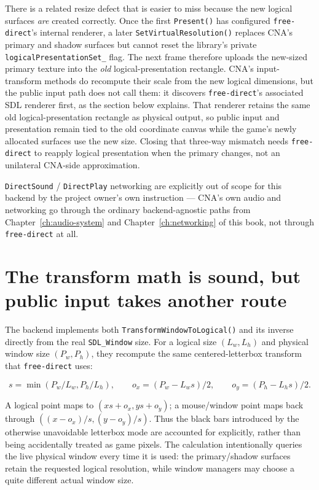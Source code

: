 There is a related resize defect that is easier to miss because the new logical surfaces
\emph{are} created correctly. Once the first \texttt{Present()} has configured
\texttt{free-direct}'s internal renderer, a later \texttt{SetVirtualResolution()} replaces CNA's
primary and shadow surfaces but cannot reset the library's private
\texttt{logicalPresentationSet\_} flag. The next frame therefore uploads the new-sized primary
texture into the \emph{old} logical-presentation rectangle. CNA's input-transform methods
do recompute their scale from the new logical dimensions, but the public input path does not
call them: it discovers \texttt{free-direct}'s associated SDL renderer first, as the section
below explains. That renderer retains the same old logical-presentation rectangle as physical
output, so public input and presentation remain tied to the old coordinate canvas while the
game's newly allocated surfaces use the new size. Closing that three-way mismatch needs
\texttt{free-direct} to reapply logical presentation when the primary changes, not an
unilateral CNA-side approximation.

\texttt{DirectSound} / \texttt{DirectPlay} networking are explicitly out
of scope for this backend by the project owner's own instruction --- CNA's own audio and
networking go through the ordinary backend-agnostic paths from Chapter~\ref{ch:audio-system}
and Chapter~\ref{ch:networking} of this book, not through \texttt{free-direct} at all.

\section{The transform math is sound, but public input takes another route}

The backend implements both \texttt{TransformWindowToLogical()} and its inverse directly from
the real \texttt{SDL\_Window} size. For a logical size $(L_w,L_h)$ and physical window size
$(P_w,P_h)$, they recompute the same centered-letterbox transform that
\texttt{free-direct} uses:

\[
s = \min(P_w/L_w, P_h/L_h), \qquad
o_x = (P_w - L_w s)/2, \qquad o_y = (P_h - L_h s)/2.
\]

A logical point maps to $(x s + o_x, y s + o_y)$; a mouse/window point maps back through
$((x-o_x)/s, (y-o_y)/s)$. Thus the black bars introduced by the otherwise unavoidable
letterbox mode are accounted for explicitly, rather than being accidentally treated as game
pixels. The calculation intentionally queries the live physical window every time it is used:
the primary/shadow surfaces retain the requested logical resolution, while window managers may
choose a quite different actual window size.

